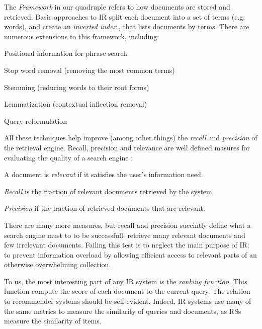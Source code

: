 The \emph{Framework} in our quadruple refers to how documents are stored and retrieved.
Basic approaches to IR split each document into a set of terms (e.g. words),
and create an \emph{inverted index}
\cite[p22]{Manning2008},
that lists documents by terms.
There are numerous extensions to this framework, including: 

\begin{itemize*}
  \item Positional information for phrase search \cite[p39]{Manning2008}
  \item Stop word removal (removing the most common terms) \cite[p27]{Manning2008}
  \item Stemming (reducing words to their root forms) \cite[p32]{Manning2008}
  \item Lemmatization (contextual inflection removal) \cite[p32]{Manning2008}
  \item Query reformulation \citep[p117]{Baeza-Yates1999}
\end{itemize*}

All these techniques help improve (among other things)
the \emph{recall} and \emph{precision} of the retrieval engine. 
Recall, precision and relevance are well defined masures for evaluating the quality of a search engine \cite[p5]{Manning2008}:

\begin{itemize*}
  \item A document is \emph{relevant} if it satisfies the user's information need.
  \item \emph{Recall} is the fraction of relevant documents retrieved by the system.
  \item \emph{Precision} if the fraction of retrieved documents that are relevant.
\end{itemize*}

There are many more measures, but recall and precision succintly define what a search engine must to
to be successfull: retrieve many relevant documents and few irrelevant documents.
Failing this test is to neglect the main purpose of IR:
to prevent information overload by allowing efficient access 
to relevant parts of an otherwise overwhelming collection.

To us, the most interesting part of any IR system is the \emph{ranking function}.
This function compute the score of each document to the current query. 
The relation to recommender systems should be self-evident.
Indeed, IR systems use many of the same metrics to measure the similarity of queries and documents,
as RSs measure the similarity of items.

